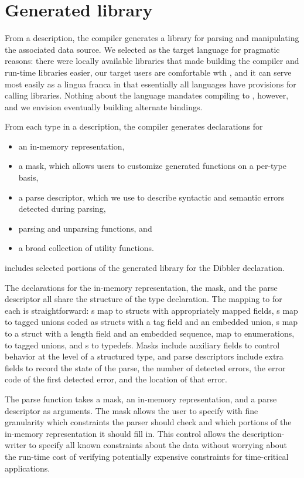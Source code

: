 \documentclass{sig-alternate}
\begin{document}
\section{Generated library}
From a \pads{} description, the \pads{} compiler generates a \C{} library
for parsing and manipulating the associated data source.  We selected \C{}
as the target language for pragmatic reasons: there were locally available
libraries that made building the compiler and run-time libraries easier,
our target users are comfortable wth \C{}, and it can serve most easily
as a lingua franca in that essentially all languages have provisions for 
calling \C{} libraries.  Nothing about the \pads{} language mandates compiling
to \C{}, however, and we envision eventually building alternate bindings.

From each type in a \pads{} description, the compiler generates 
\C{} declarations for
\begin{itemize}
\item an in-memory representation, 
\item a mask, which allows users to customize generated functions
on a per-type basis,
\item a parse descriptor, which we use to describe syntactic and
semantic errors detected during parsing, 
\item parsing and unparsing functions, and 
\item a broad collection of utility functions.
\end{itemize}

 includes selected portions of the generated 
library for the Dibbler  declaration.

The \C{} declarations for the in-memory representation, the mask, 
and the parse descriptor all share the structure of the \pads{}
type declaration.  The mapping to \C{} for each is straightforward: 
s map to \C{} structs with appropriately mapped fields, 
s map to tagged unions coded as \C{} structs with a tag field 
and an embedded 
union, s map to a \C{} struct with a length field and an 
embedded sequence,  map to \C{} enumerations,  
to tagged unions, and s to \C{} typedefs.  Masks include
auxiliary fields to control behavior at the level of a structured
type, and parse descriptors include extra fields to record the 
state of the parse, the number of detected errors, 
the error code of the first detected error, and the location of that error.

The parse function takes a mask, an
in-memory representation, and a parse descriptor as arguments.  
The mask allows the user to specify with fine granularity
which constraints the parser should check and which portions of the
in-memory representation it should fill in.  This control allows the
description-writer to specify all known constraints about the data
without worrying about the run-time cost of verifying potentially
expensive constraints for time-critical applications.
\end{document}
